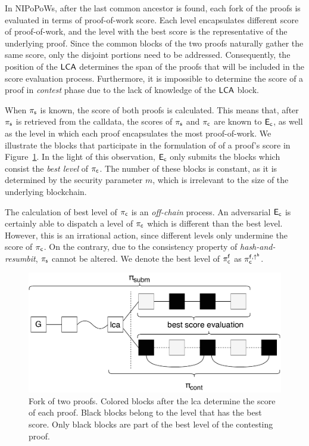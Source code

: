 In NIPoPoWs, after the last common ancestor is found, each fork of the proofs
is evaluated in terms of proof-of-work score. Each level encapsulates different
score of proof-of-work, and the level with the best score is the representative
of the underlying proof. Since the common blocks of the two proofs naturally
gather the same score, only the disjoint portions need to be addressed.
Consequently, the position of the $\mathsf{LCA}$ determines the span of the proofs that
will be included in the score evaluation process. Furthermore, it is impossible
to determine the score of a proof in \emph{contest} phase due to the lack of
knowledge of the $\mathsf{LCA}$ block.

When $\mathsf{\pi_{s}}$ is known, the score of both proofs is calculated. This means that,
after $\mathsf{\pi_{s}}$ is retrieved from the calldata, the scores of $\mathsf{\pi_{s}}$ and $\mathsf{\pi_{c}}$
are known to $\mathsf{E_{c}}$, as well as the level in which each proof encapsulates the
most proof-of-work. We illustrate the blocks that participate in the
formulation of of a proof's score in Figure~\ref{fig:score-at-levels}. In the
light of this observation, $\mathsf{E_{c}}$ only submits the blocks which consist the
\emph{best level} of $\mathsf{\pi_{c}}$. The number of these blocks is constant, as it is
determined by the security parameter $m$, which is irrelevant to the size of
the underlying blockchain.

The calculation of best level of $\mathsf{\pi_{c}}$ is an \emph{off-chain} process.
An adversarial $\mathsf{E_{c}}$ is certainly able to dispatch a level of $\mathsf{\pi_{c}}$ which is
different than the best level. However, this is an irrational action, since
different levels only undermine the score of $\mathsf{\pi_{c}}$. On the contrary, due to
the consistency property of \emph{hash-and-resumbit}, $\mathsf{\pi_{s}}$ cannot be altered.
We denote the best level of $\mathsf{\pi_{c}^{f}}$ as $\mathsf{\pi_{c}^{f, \uparrow^{b}}}$.

\begin{figure}[H]
    \begin{center}
        \includegraphics[width=1\columnwidth]{figures/blocks-of-best-level.pdf}
    \end{center}
    \caption{Fork of two proofs. Colored blocks after the lca determine the
    score of each proof. Black blocks belong to the level that
    has the best score. Only black blocks are part of the best level of the
    contesting proof.}
    \label{fig:score-at-levels}
\end{figure}

